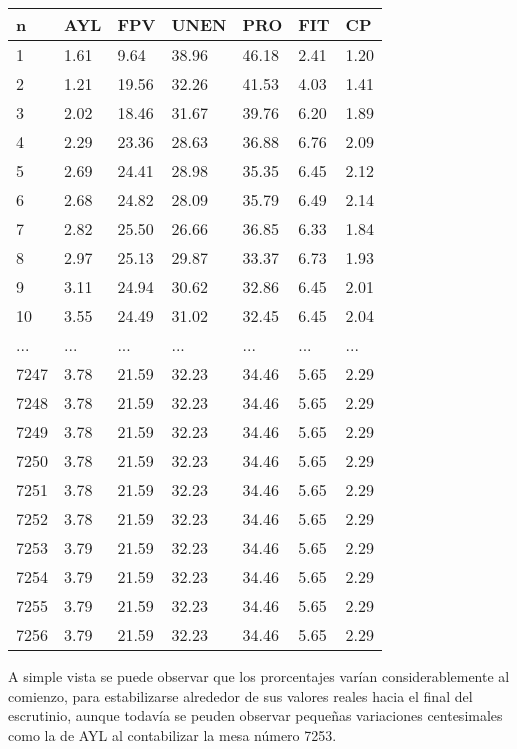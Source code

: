\documentclass[12pt, a4paper]{article}
\begin{document}
\begin{center}
	\begin{tabular}{l | llllll}
n & AYL & FPV & UNEN & PRO & FIT & CP \\ \hline
1 & 1.61 & 9.64 & 38.96 & 46.18 & 2.41 & 1.20 \\
2 & 1.21 & 19.56 & 32.26 & 41.53 & 4.03 & 1.41 \\
3 & 2.02 & 18.46 & 31.67 & 39.76 & 6.20 & 1.89 \\
4 & 2.29 & 23.36 & 28.63 & 36.88 & 6.76 & 2.09 \\
5 & 2.69 & 24.41 & 28.98 & 35.35 & 6.45 & 2.12 \\
6 & 2.68 & 24.82 & 28.09 & 35.79 & 6.49 & 2.14 \\
7 & 2.82 & 25.50 & 26.66 & 36.85 & 6.33 & 1.84 \\
8 & 2.97 & 25.13 & 29.87 & 33.37 & 6.73 & 1.93 \\
9 & 3.11 & 24.94 & 30.62 & 32.86 & 6.45 & 2.01 \\
10 & 3.55 & 24.49 & 31.02 & 32.45 & 6.45 & 2.04 \\
... & ... & ... & ... & ... & ... & ...  \\
7247 & 3.78 & 21.59 & 32.23 & 34.46 & 5.65 & 2.29 \\
7248 & 3.78 & 21.59 & 32.23 & 34.46 & 5.65 & 2.29 \\
7249 & 3.78 & 21.59 & 32.23 & 34.46 & 5.65 & 2.29 \\
7250 & 3.78 & 21.59 & 32.23 & 34.46 & 5.65 & 2.29 \\
7251 & 3.78 & 21.59 & 32.23 & 34.46 & 5.65 & 2.29 \\
7252 & 3.78 & 21.59 & 32.23 & 34.46 & 5.65 & 2.29 \\
7253 & 3.79 & 21.59 & 32.23 & 34.46 & 5.65 & 2.29 \\
7254 & 3.79 & 21.59 & 32.23 & 34.46 & 5.65 & 2.29 \\
7255 & 3.79 & 21.59 & 32.23 & 34.46 & 5.65 & 2.29 \\
7256 & 3.79 & 21.59 & 32.23 & 34.46 & 5.65 & 2.29 \\
	\end{tabular}
\end{center}

A simple vista se puede observar que los prorcentajes var\'ian considerablemente al comienzo, para estabilizarse alrededor de sus valores reales hacia el final del escrutinio, aunque todav\'ia se peuden observar peque\~nas variaciones centesimales como la de AYL al contabilizar la mesa n\'umero 7253.
\end{document}
